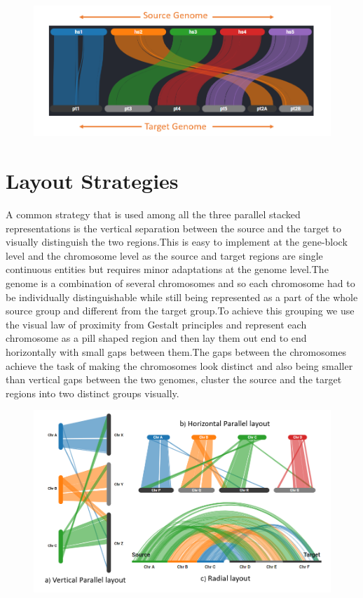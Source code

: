 \begin{figure}
  \centering
  \includegraphics[width=.75\linewidth]{images/ch_4_genome_level.PNG}
  \label{fig:ch_4_genome_level}
\end{figure}



\section{Layout Strategies}

A common strategy that is used among all the three parallel stacked representations is the vertical separation between the source and the target to visually distinguish the two regions.This is easy to implement at the gene-block level and the chromosome level as the source and target regions are single continuous entities but requires minor adaptations at the genome level.The genome is a combination of several chromosomes and so each chromosome had to be individually distinguishable while still being represented as a part of the whole source group and different from the target group.To achieve this grouping we use the visual law of proximity from Gestalt principles \cite{wertheimer1923untersuchungen} and represent each chromosome as a pill shaped region and then lay them out end to end horizontally with small gaps between them.The gaps between the chromosomes achieve the task of making the chromosomes look distinct and also being smaller than vertical gaps between the two genomes, cluster the source and the target regions into two distinct groups visually.

\begin{figure}
  \centering
  \includegraphics[width=.75\linewidth]{images/ch_4_layout.PNG}
  \label{fig:ch_4_layout}
\end{figure}



